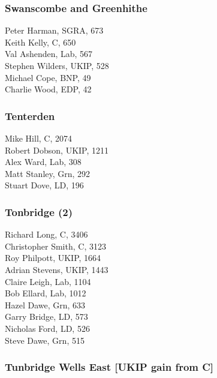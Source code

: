 \documentclass[a4paper,openany,10pt]{book}
\begin{document}
\subsubsection*{Swanscombe and Greenhithe}



Peter Harman, SGRA, 673\\
Keith Kelly, C, 650\\
Val Ashenden, Lab, 567\\
Stephen Wilders, UKIP, 528\\
Michael Cope, BNP, 49\\
Charlie Wood, EDP, 42\\


\subsubsection*{Tenterden}



Mike Hill, C, 2074\\
Robert Dobson, UKIP, 1211\\
Alex Ward, Lab, 308\\
Matt Stanley, Grn, 292\\
Stuart Dove, LD, 196\\


\subsubsection*{Tonbridge (2)}



Richard Long, C, 3406\\
Christopher Smith, C, 3123\\
Roy Philpott, UKIP, 1664\\
Adrian Stevens, UKIP, 1443\\
Claire Leigh, Lab, 1104\\
Bob Ellard, Lab, 1012\\
Hazel Dawe, Grn, 633\\
Garry Bridge, LD, 573\\
Nicholas Ford, LD, 526\\
Steve Dawe, Grn, 515\\


\subsubsection*{Tunbridge Wells East \hspace*{\fill}\nolinebreak[1]%
\enspace\hspace*{\fill}
[UKIP gain from C]}
\end{document}
